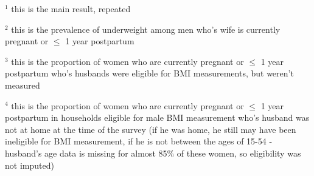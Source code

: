 \documentclass[12pt]{article}
\begin{document}
\begin{table}[!htbp]
    \centering
    \begin{threeparttable}[t]
        \caption{:  Underweight prevalence of prepregnant women and men who's wife is pregnant or $\le$ 1 year postpartum}

        \scriptsize
        \setlength{\tabcolsep}{2pt}
        \renewcommand{\arraystretch}{1.2}

        

        \begin{tablenotes}
        \item $^1$ this is the main result, repeated
        \item $^2$ this is the prevalence of underweight among men who's wife is currently pregnant or $\le$ 1 year postpartum
        \item $^3$ this is the proportion of women who are currently pregnant or $\le$ 1 year postpartum who's husbands were eligible for BMI measurements, but weren't measured

        \item $^4$ this is the proportion of women who are currently pregnant or $\le$ 1 year postpartum in households eligible for male BMI measurement who's husband was not at home at the time of the survey (if he was home, he still may have been ineligible for BMI measurement, if he is not between the ages of 15-54 - husband's age data is missing for almost 85\% of these women, so eligibility was not imputed)
        
        \end{tablenotes}
    \end{threeparttable}
\end{table}
\end{document}
